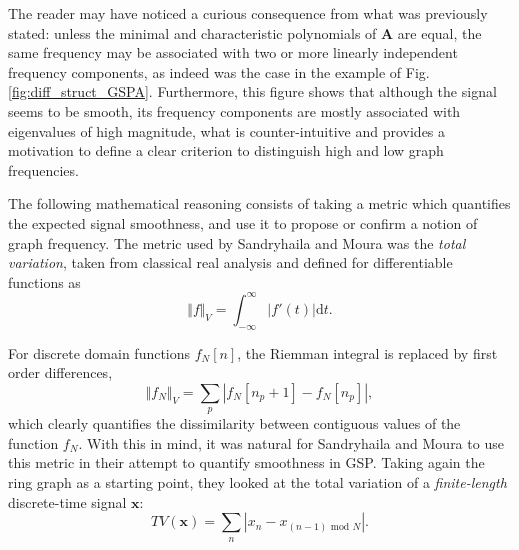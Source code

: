 The reader may have noticed a curious consequence from what was previously stated: unless the minimal and characteristic polynomials of $ \mathbf{A} $ are equal, the same frequency may be associated with two or more linearly independent frequency components, as indeed was the case in the example of Fig. \ref{fig:diff_struct_GSPA}. Furthermore, this figure shows that although the signal seems to be smooth, its frequency components are mostly associated with eigenvalues of high magnitude, what is counter-intuitive and provides a motivation to define a clear criterion to distinguish high and low graph frequencies.

The following mathematical reasoning consists of taking a metric which quantifies the expected signal smoothness, and use it to propose or confirm a notion of graph frequency. The metric used by Sandryhaila and Moura was the \emph{total variation}, taken from classical real analysis and defined for differentiable functions as \cite{rudin1987real,mallat1999wavelet}
\begin{equation}
\Vert f \Vert_V = \int_{-\infty}^{\infty} |f'(t)| \mathrm{d}t.
\end{equation}

For discrete domain functions $ f_N[n] $, the Riemman integral is replaced by first order differences,
\begin{equation}
\Vert f_N \Vert_V = \sum_p |f_N[n_p + 1] - f_N[n_p]|,
\end{equation}
which clearly quantifies the dissimilarity between contiguous values of the function $ f_N $. With this in mind, it was natural for Sandryhaila and Moura to use this metric in their attempt to quantify smoothness in GSP. Taking again the ring graph as a starting point, they looked at the total variation of a \textit{finite-length} discrete-time signal $ \mathbf{x} $:
\begin{equation}
\label{eq:TV}
TV(\mathbf{x}) = \sum_n | x_n - x_{(n-1) \text{ mod } N}|.
\end{equation}

